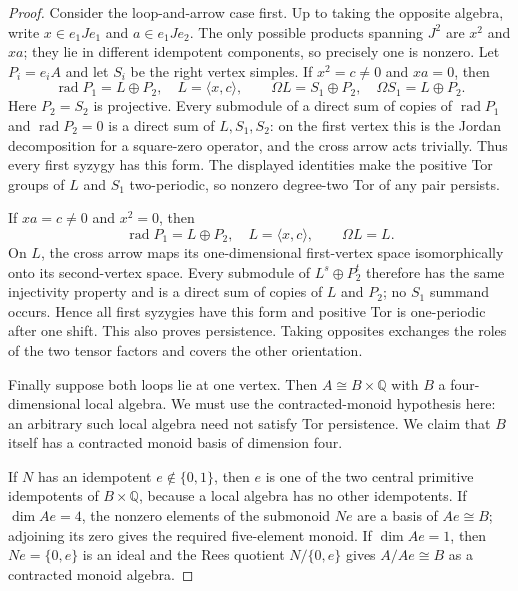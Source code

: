 \begin{proof}
Consider the loop-and-arrow case first.  Up to taking the opposite
algebra, write $x\in e_1Je_1$ and $a\in e_1Je_2$.
The only possible products spanning $J^2$ are $x^2$ and $xa$;
they lie in different idempotent components, so precisely one
is nonzero.  Let $P_i=e_iA$ and let $S_i$ be the right vertex
simples.
If $x^2=c\ne0$ and $xa=0$, then
\[
 \operatorname{rad}P_1=L\oplus P_2,
 \quad L=\langle x,c\rangle,\qquad
 \Omega L=S_1\oplus P_2,\quad
 \Omega S_1=L\oplus P_2.
\]
Here $P_2=S_2$ is projective.  Every submodule of a direct sum
of copies of $\operatorname{rad}P_1$ and
$\operatorname{rad}P_2=0$ is a direct sum of $L,S_1,S_2$:
on the first vertex this is the Jordan decomposition for a
square-zero operator, and the cross arrow acts trivially.
Thus every first syzygy has this form.  The displayed identities
make the positive Tor groups of $L$ and $S_1$ two-periodic, so
nonzero degree-two Tor of any pair persists.

If $xa=c\ne0$ and $x^2=0$, then
\[
 \operatorname{rad}P_1=L\oplus P_2,
 \quad L=\langle x,c\rangle,\qquad \Omega L=L.
\]
On $L$, the cross arrow maps its one-dimensional first-vertex
space isomorphically onto its second-vertex space.
Every submodule of $L^s\oplus P_2^t$ therefore has the same
injectivity property and is a direct sum of copies of $L$ and
$P_2$; no $S_1$ summand occurs.  Hence all first syzygies have
this form and positive Tor is one-periodic after one shift.
This also proves persistence.  Taking opposites exchanges the
roles of the two tensor factors and covers the other orientation.

Finally suppose both loops lie at one vertex.  Then
$A\cong B\times\mathbb Q$ with $B$ a four-dimensional local
algebra.  We must use the contracted-monoid hypothesis here:
an arbitrary such local algebra need not satisfy Tor persistence.
We claim that $B$ itself has a contracted monoid basis of
dimension four.

If $N$ has an idempotent $e\notin\{0,1\}$, then $e$ is one of
the two central primitive idempotents of $B\times\mathbb Q$,
because a local algebra has no other idempotents.
If $\dim Ae=4$, the nonzero elements of the submonoid $Ne$
are a basis of $Ae\cong B$; adjoining its zero gives the required
five-element monoid.
If $\dim Ae=1$, then $Ne=\{0,e\}$ is an ideal and the Rees
quotient $N/\{0,e\}$ gives $A/Ae\cong B$ as a contracted
monoid algebra.


\end{proof}
